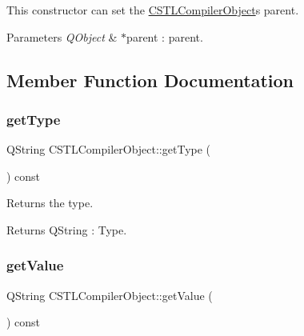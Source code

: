 This constructor can set the \mbox{\hyperlink{class_c_s_t_l_compiler_object}{C\+S\+T\+L\+Compiler\+Object}}\textquotesingle{}s parent. 


\begin{DoxyParams}{Parameters}
{\em Q\+Object} & $\ast$parent \+: parent. \\
\hline
\end{DoxyParams}


\subsection{Member Function Documentation}
\mbox{\label{class_c_s_t_l_compiler_object_a3e853137310474444650ad78e307b9a8}} 
\subsubsection{\texorpdfstring{get\+Type}{getType}}
{\footnotesize\ttfamily Q\+String C\+S\+T\+L\+Compiler\+Object\+::get\+Type (\begin{DoxyParamCaption}{ }\end{DoxyParamCaption}) const\hspace{0.3cm}{\ttfamily [slot]}}



Returns the type. 

\begin{DoxyReturn}{Returns}
Q\+String \+: Type. 
\end{DoxyReturn}
\mbox{\label{class_c_s_t_l_compiler_object_a3ee0eea5271717302cd4cb34720b656e}} 
\subsubsection{\texorpdfstring{get\+Value}{getValue}}
{\footnotesize\ttfamily Q\+String C\+S\+T\+L\+Compiler\+Object\+::get\+Value (\begin{DoxyParamCaption}{ }\end{DoxyParamCaption}) const\hspace{0.3cm}{\ttfamily [slot]}}



